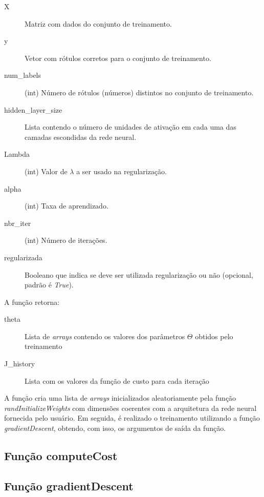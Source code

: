 \documentclass[12pt]{article}
\begin{document}
\begin{description}
\item[X] Matriz com dados do conjunto de treinamento.

\item[y] Vetor com rótulos corretos para o conjunto de treinamento.

\item[num\_labels] (int) Número de rótulos (números) distintos no conjunto de treinamento.

\item[hidden\_layer\_size] Lista contendo o número de unidades de ativação em cada uma das camadas escondidas da rede neural.

\item[Lambda] (int) Valor de $\lambda$ a ser usado na regularização.

\item[alpha] (int) Taxa de aprendizado.

\item[nbr\_iter] (int) Número de iterações.

\item[regularizada] Booleano que indica se deve ser utilizada regularização ou não (opcional, padrão é \textit{True}).
\end{description}

A função retorna:

\begin{description}
\item[theta] Lista de \textit{arrays} contendo os valores dos parâmetros $\Theta$ obtidos pelo treinamento

\item[J\_history] Lista com os valores da função de custo para cada iteração
\end{description}

A função cria uma lista de \textit{arrays} inicializados aleatoriamente pela função \textit{randInitializeWeights} com dimensões coerentes com a arquitetura da rede neural fornecida pelo usuário. Em seguida, é realizado o treinamento utilizando a função \textit{gradientDescent}, obtendo, com isso, os argumentos de saída da função.

\subsection{Função computeCost}

\subsection{Função gradientDescent}
\end{document}
